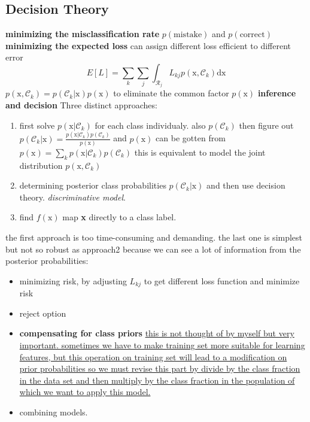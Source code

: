 \documentclass[a4paper]{book}
\begin{document}
\subsection{Decision Theory}
\textbf{minimizing the misclassification rate}\newline
$p(\mathrm{mistake})$ and $p(\mathrm{correct})$
\textbf{minimizing the expected loss}\newline
can assign different loss efficient to different error
\begin{equation}\label{eq1.8}
  E[L] = \sum_k\sum_j\int_{\mathcal{R}_j}L_{kj}p(\mathrm{x},\mathcal{C}_k)\mathrm {dx}
\end{equation}
$p(\mathrm{x},\mathcal{C}_k) = p(\mathcal{C}_k|\mathrm{x})p(\mathrm{x})$ to eliminate the common factor $p(\mathrm x)$ \newline
\textbf{ inference and decision}\newline
Three distinct approaches:
\begin{enumerate}
  \item first solve $p(\mathrm{x}|\mathcal C_k)$ for each class individualy. also $p(\mathcal C_k)$  then figure out $p(\mathcal C_k|\mathrm x) = \frac{p(\mathrm x|\mathcal C_k)p(\mathcal C_k)}{p(\mathrm x)}$ and $p(\mathrm x)$ can be gotten from $p(\mathrm x) = \sum_kp(\mathrm x|\mathcal C_k)p(\mathcal C_k)$ this is equivalent to model the joint distribution $p(\mathrm x, \mathcal C_k)$
  \item determining posterior class probabilities $p(\mathcal C_k|\mathrm x )$  and then use decision theory.  \emph{discriminative model}.
  \item find $f(\mathrm x)$ map \textbf{x} directly to a class label.
\end{enumerate}
the first approach is too time-consuming and demanding.\newline
the last one is simplest but not so robust as approach2 because we can see a lot of information from the posterior probabilities:
\begin{itemize}
  \item  minimizing risk,  by adjusting $L_{kj}$ to get different loss function and minimize risk
  \item reject option
  \item \textbf{compensating for class priors} \uline{this is not thought of by myself but very important. sometimes we have to make training set more suitable for learning features, but this operation on training set will lead to a modification on prior probabilities so we must revise this part by divide by the class fraction in the data set and then multiply by the class fraction in the population of which we want to apply this model.}
  \item combining models.
\end{itemize}
\end{document}
